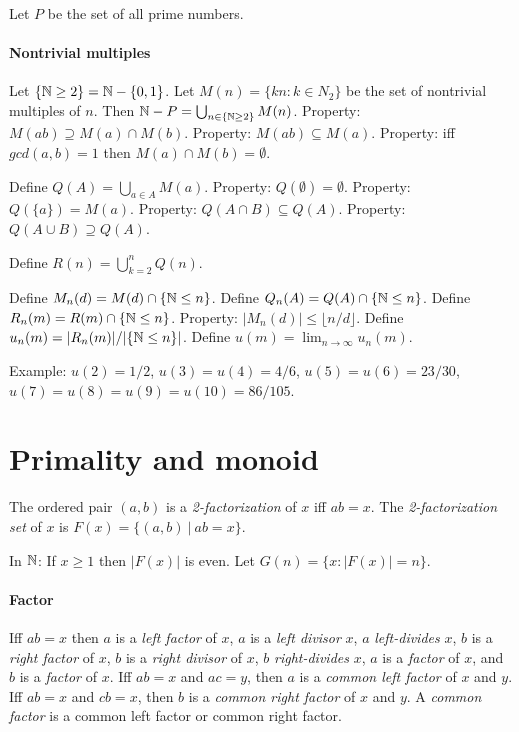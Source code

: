 Let \(P\) be the set of all prime numbers.

\paragraph{Nontrivial multiples}
Let \(\{\mathbb{N}\ge 2\} = \mathbb{N} - \{0,1\}\).
Let \(M(n) = \{ k n : k \in N_2 \}\) be the set of nontrivial multiples of \(n\).
Then \( \mathbb{N} - P = \bigcup_{n \in \{\mathbb{N}\ge 2\}} M(n) \).
Property: \(M(ab) \supseteq M(a) \cap M(b)\).
Property: \(M(ab) \subseteq M(a)\).
Property: iff \(gcd(a,b)=1\) then \(M(a) \cap M(b) = \emptyset\).

Define \(Q(A) = \bigcup_{a \in A} M(a)\).
Property: \(Q(\emptyset) = \emptyset\).
Property: \(Q(\{a\}) = M(a)\).
Property: \(Q(A \cap B) \subseteq Q(A)\).
Property: \(Q(A \cup B) \supseteq Q(A)\).

Define \(R(n) = \bigcup_{k=2}^n Q(n)\).

Define \(M_n(d) = M(d) \cap \{\mathbb{N} \le n\}\).
Define \(Q_n(A) = Q(A) \cap \{\mathbb{N} \le n\}\).
Define \(R_n(m) = R(m) \cap \{\mathbb{N} \le n\}\).
Property: \(|M_n(d)| \le \lfloor n/d \rfloor\).
Define \(u_n(m) = |R_n(m)| / |\{\mathbb{N} \le n\}|\).
Define \(u(m) = \lim_{n \to \infty} u_n(m)\).

Example: \(u(2) = 1/2\), \(u(3) = u(4) = 4/6\), \(u(5) = u(6) = 23/30\), \(u(7) = u(8) = u(9) = u(10) = 86/105\).

\section{Primality and monoid}

The ordered pair \((a,b)\) is a \emph{2-factorization} of \(x\) iff \(ab = x\).
The \emph{2-factorization set} of \(x\) is \(F(x) = \{ (a,b) ~|~ ab = x \}\).

In \(\mathbb{N}\):
If \(x \ge 1\) then \(|F(x)|\) is even.
Let \(G(n) = \{ x : |F(x)| = n \}\).

\paragraph{Factor}
Iff \(ab = x\) then
\(a\) is a \emph{left factor} of \(x\),
\(a\) is a \emph{left divisor} \(x\),
\(a\) \emph{left-divides} \(x\),
\(b\) is a \emph{right factor} of \(x\),
\(b\) is a \emph{right divisor} of \(x\),
\(b\) \emph{right-divides} \(x\),
\(a\) is a \emph{factor} of \(x\),
and \(b\) is a \emph{factor} of \(x\).
Iff \(ab = x\) and \(ac = y\),
then \(a\) is a \emph{common left factor} of \(x\) and \(y\).
Iff \(ab = x\) and \(cb = x\),
then \(b\) is a \emph{common right factor} of \(x\) and \(y\).
A \emph{common factor} is a common left factor or common right factor.

